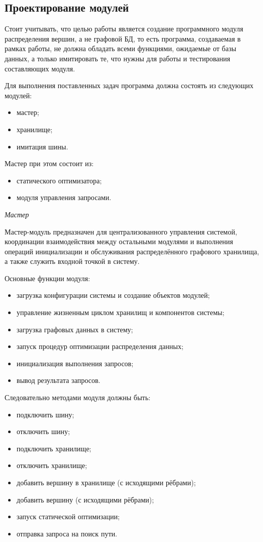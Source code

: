 \subsection{Проектирование модулей}

Стоит учитывать, что целью работы является создание программного модуля распределения вершин, а не графовой БД, то есть программа, создаваемая в рамках работы, не должна обладать всеми функциями, ожидаемые от базы данных, а только имитировать те, что нужны для работы и тестирования составляющих модуля.

Для выполнения поставленных задач программа должна состоять из следующих модулей:
\begin{itemize}
    \item мастер;
    \item хранилище;
    \item имитация шины.
\end{itemize}

Мастер при этом состоит из:
\begin{itemize}
    \item статического оптимизатора;
    \item модуля управления запросами.
\end{itemize}

\textit{Мастер}

Мастер-модуль предназначен для централизованного управления системой,
координации взаимодействия между остальными модулями и выполнения операций
инициализации и обслуживания распределённого графового хранилища, а также служить входной точкой в систему.

Основные функции модуля:
\begin{itemize}
    \item загрузка конфигурации системы и создание объектов модулей;
    \item управление жизненным циклом хранилищ и компонентов системы;
    \item загрузка графовых данных в систему;
    \item запуск процедур оптимизации распределения данных;
    \item инициализация выполнения запросов;
    \item вывод результата запросов.
\end{itemize}

Следовательно методами модуля должны быть:
\begin{itemize}
    \item подключить шину;
    \item отключить шину;
    \item подключить хранилище;
    \item отключить хранилище;
    \item добавить вершину в хранилище (с исходящими рёбрами);
    \item добавить вершину (с исходящими рёбрами);
    \item запуск статической оптимизации;
    \item отправка запроса на поиск пути.
\end{itemize}


